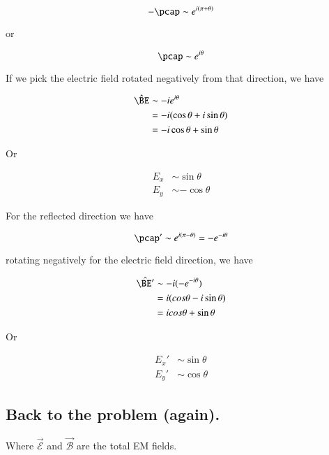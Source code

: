 \begin{equation}\label{eqn:relativisticElectrodynamicsT9:520}
-\pcap \sim e^{i (\pi + \theta) }
\end{equation}

or

\begin{equation}\label{eqn:relativisticElectrodynamicsT9:540}
\pcap \sim e^{i\theta}
\end{equation}

If we pick the electric field rotated negatively from that direction, we have

\begin{align*}
\hat{\BE} 
&\sim -i e^{i \theta} \\
&= -i (\cos\theta + i \sin\theta) \\
&= -i \cos\theta + \sin\theta
\end{align*}

Or

\begin{align}\label{eqn:relativisticElectrodynamicsT9:560}
E_x &\sim \sin\theta \\
E_y &\sim -\cos\theta
\end{align}

For the reflected direction we have

\begin{equation}\label{eqn:relativisticElectrodynamicsT9:580}
\pcap' \sim e^{i (\pi - \theta)} = - e^{-i \theta}
\end{equation}

rotating negatively for the electric field direction, we have

\begin{align*}
\hat{\BE'} 
&\sim -i (- e^{-i\theta} ) \\
&= i(cos\theta - i\sin\theta) \\
&= i cos\theta + \sin\theta
\end{align*}

Or

\begin{align}\label{eqn:relativisticElectrodynamicsT9:600}
E_x' &\sim \sin\theta \\
E_y' &\sim \cos\theta 
\end{align}

\subsection{Back to the problem (again).}

Where $\vec{\mathcal{E}}$ and $\vec{\mathcal{B}}$ are the total EM fields.

